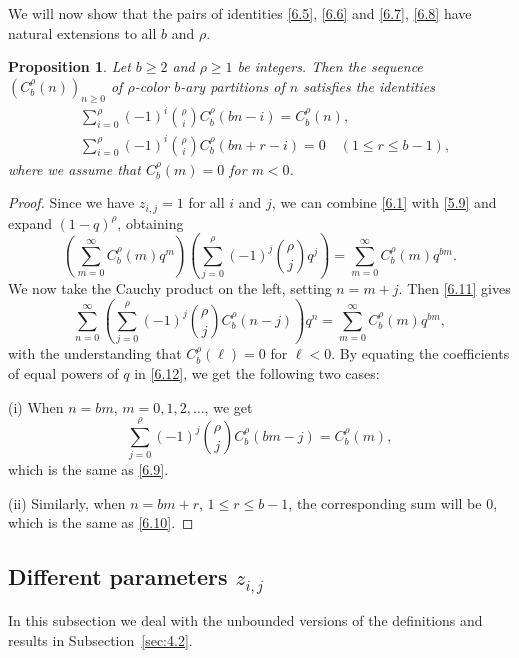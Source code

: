 \documentclass{amsart}
\theoremstyle{plain}
\newtheorem{proposition}[theorem]{Proposition}
\numberwithin{equation}{section}
\begin{document}
We will now show that the pairs of identities \eqref{6.5}, \eqref{6.6} and
\eqref{6.7}, \eqref{6.8} have natural extensions to all $b$ and $\rho$.

\begin{proposition}\label{prop:6.5}
Let $b\geq 2$ and $\rho\geq 1$ be integers. Then the sequence
$\left(C_b^\rho(n)\right)_{n\geq 0}$ of $\rho$-color $b$-ary partitions of $n$
satisfies the identities
\begin{align}
&\sum_{i=0}^\rho(-1)^i\binom{\rho}{i}C_b^\rho(bn-i)=C_b^\rho(n),\label{6.9}\\
&\sum_{i=0}^\rho(-1)^i\binom{\rho}{i}C_b^\rho(bn+r-i)=0\quad (1\leq r\leq b-1),
\label{6.10}
\end{align}
where we assume that $C_b^\rho(m)=0$ for $m<0$.
\end{proposition}

\begin{proof}
Since we have $z_{i,j}=1$ for all $i$ and $j$, we can combine \eqref{6.1} with 
\eqref{5.9} and expand $(1-q)^\rho$, obtaining
\begin{equation}\label{6.11}
\left(\sum_{m=0}^\infty C_b^\rho(m)q^m\right)
\left(\sum_{j=0}^\rho(-1)^j\binom{\rho}{j}q^j\right)
= \sum_{m=0}^\infty C_b^\rho(m)q^{bm}.
\end{equation}
We now take the Cauchy product on the left, setting $n=m+j$. Then \eqref{6.11}
gives
\begin{equation}\label{6.12}
\sum_{n=0}^\infty\left(\sum_{j=0}^\rho(-1)^j\binom{\rho}{j}C_b^\rho(n-j)\right)q^n
= \sum_{m=0}^\infty C_b^\rho(m)q^{bm},
\end{equation}
with the understanding that $C_b^\rho(\ell)=0$ for $\ell< 0$. By equating the
coefficients of equal powers of $q$ in \eqref{6.12}, we get the following two
cases:

(i) When $n=bm$, $m=0, 1, 2,\ldots$, we get
\[
\sum_{j=0}^\rho(-1)^j\binom{\rho}{j}C_b^\rho(bm-j) = C_b^\rho(m),
\]
which is the same as \eqref{6.9}.

(ii) Similarly, when $n=bm+r$, $1\leq r\leq b-1$, the corresponding sum will
be 0, which is the same as \eqref{6.10}.
\end{proof}


\subsection{Different parameters $z_{i,j}$}\label{sec:6.2}

In this subsection we deal with the unbounded versions of the definitions and
results in Subsection~\ref{sec:4.2}.
\end{document}
